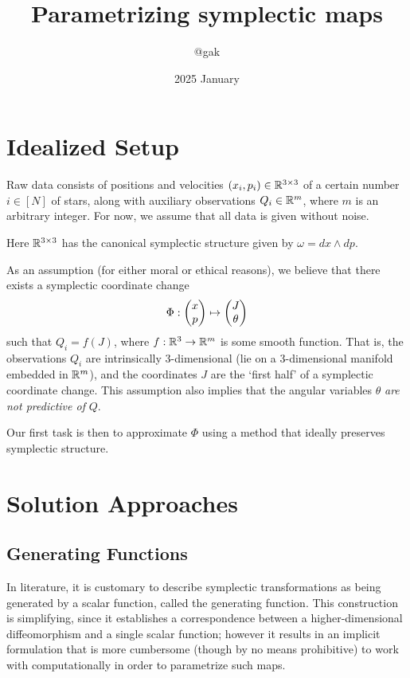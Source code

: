 \documentclass{article}
\title{Parametrizing symplectic maps}
\author{@gak}
\date{2025 January}
\begin{document}
\maketitle

\section{Idealized Setup}

Raw data consists of positions and velocities $(x_i,p_i)\in\mathbb{R}^{3\times 3}$ of a certain number $i\in[N]$ of stars, along with auxiliary observations $Q_i\in\mathbb{R}^m$, where $m$ is an arbitrary integer. For now, we assume that all data is given without noise.

Here $\mathbb{R}^{3\times 3}$ has the canonical symplectic structure given by $\omega=dx\wedge dp$.

As an assumption (for either moral or ethical reasons), we believe that there exists a symplectic coordinate change
\begin{align*}
    \Phi:\mqty(x\\p)\mapsto\mqty(J\\\theta)
\end{align*}
such that $Q_i=f(J)$, where $f:\mathbb{R}^3\to\mathbb{R}^m$ is some smooth function. That is, the observations $Q_i$ are  intrinsically 3-dimensional (lie on a 3-dimensional manifold embedded in $\mathbb{R}^m$), and the coordinates $J$ are the `first half' of a symplectic coordinate change. This assumption also implies that the angular variables $\theta$ \textit{are not predictive of} $Q$.

Our first task is then to approximate $\Phi$ using a method that ideally preserves symplectic structure.

\section{Solution Approaches}

\subsection{Generating Functions}

In literature, it is customary to describe symplectic transformations as being generated by a scalar function, called the generating function. This construction is simplifying, since it establishes a correspondence between a higher-dimensional diffeomorphism and a single scalar function; however  it results in an implicit formulation that is more cumbersome (though by no means prohibitive) to work with computationally in order to parametrize such maps.
\end{document}
